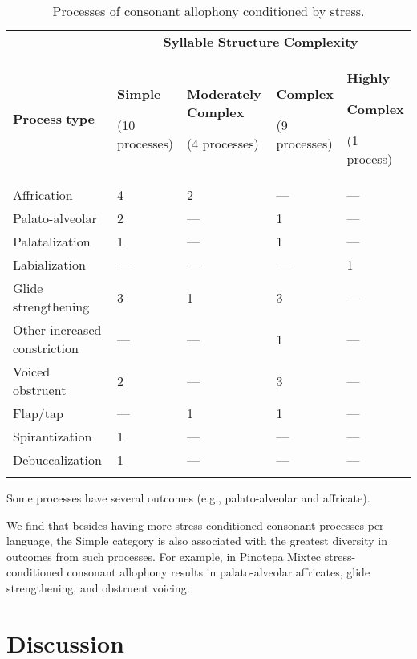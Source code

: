 \begin{table}
\begin{tabularx}{\textwidth}{XXXXX}
\lsptoprule
 & \multicolumn{4}{c}{ \textbf{Syllable} \textbf{Structure} \textbf{Complexity}}\\
 \textbf{Process} \textbf{type} & { \textbf{Simple}}

 (10 processes) & { \textbf{Moderately} \textbf{Complex}}

 (4 processes) & { \textbf{Complex}}

 (9 processes) & { \textbf{Highly} }

{ \textbf{Complex}}

 (1 process)\\
 Affrication & 4 & 2 & — & —\\
 Palato-alveolar & 2 & — & 1 & —\\
 Palatalization & 1 & — & 1 & —\\
 Labialization & — & — & — & 1\\
 Glide strengthening & 3 & 1 & 3 & —\\
 Other increased constriction & — & — & 1 & —\\
 Voiced obstruent & 2 & — & 3 & —\\
 Flap/tap & — & 1 & 1 & —\\
 Spirantization & 1 & — & — & —\\
 Debuccalization & 1 & — & — & —\\
\lspbottomrule
\end{tabularx}
\caption{\label{7.9}Processes of consonant allophony conditioned by stress.}Some processes have several outcomes (e.g., palato-alveolar and affricate).
\end{table}

  We find that besides having more stress-conditioned consonant processes per language, the Simple category is also associated with the greatest diversity in outcomes from such processes. For example, in Pinotepa Mixtec stress-conditioned consonant allophony results in palato-alveolar affricates, glide strengthening, and obstruent voicing.

\section{Discussion}\label{sec:7.4}

